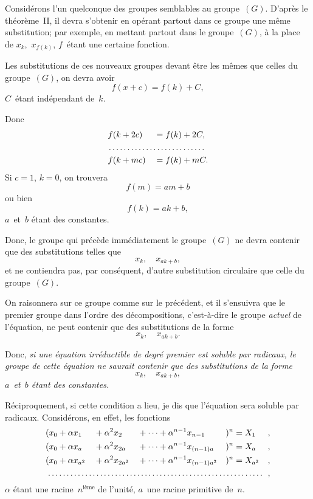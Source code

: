 \documentclass[leqno,12pt]{book}[2005/09/16]
\newenvironment{Thm}{\itshape\ignorespaces}{\normalfont}
\newcommand{\Eq}[1]{\ensuremath{#1}}
\begin{document}
Considérons l'un quelconque des groupes semblables au
groupe~\Eq{(G)}. D'après le théorème~II, il devra s'obtenir en opérant
partout dans ce groupe une même substitution; par exemple, en
mettant partout dans le groupe~\Eq{(G)}, à la place de $x_{k}$,~$x_{f(k)}$, $f$~étant
une certaine fonction.

Les substitutions de ces nouveaux groupes devant être les
mêmes que celles du groupe~\Eq{(G)}, on devra avoir
\[
f(x + c) = f(k) + C,
\]
$C$~étant indépendant de~$k$.

Donc
\begin{alignat*}{2}
&f(k + 2c) &&= f(k) + 2C, \\
\multispan{5}{\dotfill} \\
&f(k + mc) &&= f(k) + mC.
\end{alignat*}
Si $c = 1$, $k = 0$, on trouvera
\[
f(m) = am + b
\]
ou bien
\[
f(k) = ak + b,
\]
$a$~et~$b$ étant des constantes.

Donc, le groupe qui précède immédiatement le groupe~\Eq{(G)} ne
devra contenir que des substitutions telles que
\[
x_{k}, \quad x_{ak+b},
\]
et ne contiendra pas, par conséquent, d'autre substitution circulaire
que celle du groupe~\Eq{(G)}.

On raisonnera sur ce groupe comme sur le précédent, et il s'ensuivra
que le premier groupe dans l'ordre des décompositions,
c'est-à-dire le groupe \emph{actuel} de l'équation, ne peut contenir que
des substitutions de la forme
\[
x_{k},\quad x_{ak+b}.
\]

Donc, \begin{Thm}si une équation irréductible de degré premier est
soluble par radicaux, le groupe de cette équation ne saurait
contenir que des substitutions de la forme
\[
x_{k}, \quad x_{ak+b},
\]
$a$~et~$b$ étant des constantes.\end{Thm}

Réciproquement, si cette condition a lieu, je dis que l'équation
sera soluble par radicaux. Considérons, en effet, les fonctions
\begin{alignat*}{5}
& (x_{0} + \alpha x_{1}     &&{}+ \alpha^{2} x_{2}
&&{}+ \dots + \alpha^{n-1} x_{n-1}       &&)^{n} = X_{1}     && ,
\\
& (x_{0} + \alpha x_{a}     &&{}+ \alpha^{2} x_{2a}
&&{}+ \dots + \alpha^{n-1} x_{(n-1)a}    &&)^{n} = X_{a}     && ,
\\
& (x_{0} + \alpha x_{a^{2}} &&{}+ \alpha^{2} x_{2a^{2}}
&&{}+ \dots + \alpha^{n-1} x_{(n-1)a^{2}}  &&)^{n} = X_{a^{2}} && ,
\\
\multispan{9}{\dotfill} & ,
\end{alignat*}
$\alpha$ étant une racine~$n^{\text{ième}}$ de l'unité, $a$~une racine primitive de~$n$.
\end{document}
